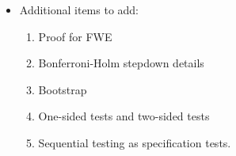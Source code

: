 \begin{itemize}[leftmargin=0pt]
\item Additional items to add:
  \begin{enumerate}
  \item Proof for FWE
  \item Bonferroni-Holm stepdown details
  \item Bootstrap
  \item One-sided tests and two-sided tests
  \item Sequential testing as specification tests.
  \end{enumerate}

\end{itemize}

